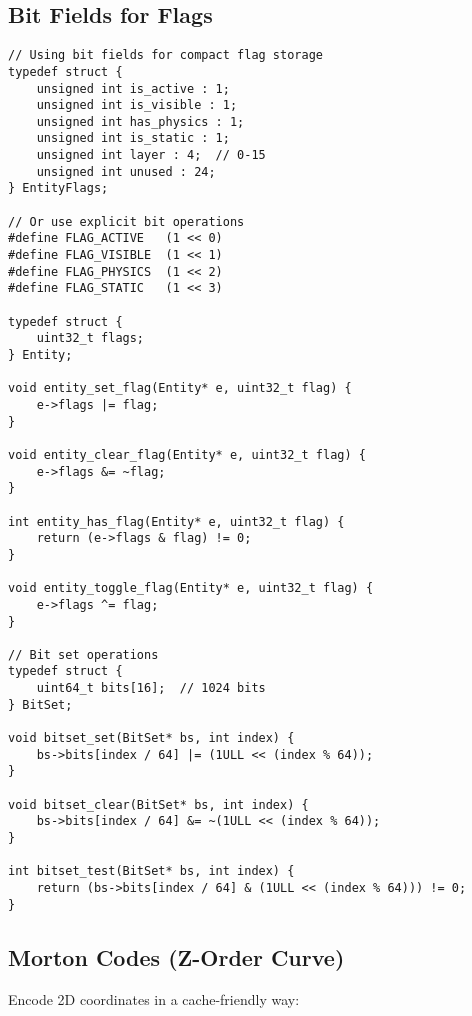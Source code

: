 \subsection{Bit Fields for Flags}

\begin{lstlisting}
// Using bit fields for compact flag storage
typedef struct {
    unsigned int is_active : 1;
    unsigned int is_visible : 1;
    unsigned int has_physics : 1;
    unsigned int is_static : 1;
    unsigned int layer : 4;  // 0-15
    unsigned int unused : 24;
} EntityFlags;

// Or use explicit bit operations
#define FLAG_ACTIVE   (1 << 0)
#define FLAG_VISIBLE  (1 << 1)
#define FLAG_PHYSICS  (1 << 2)
#define FLAG_STATIC   (1 << 3)

typedef struct {
    uint32_t flags;
} Entity;

void entity_set_flag(Entity* e, uint32_t flag) {
    e->flags |= flag;
}

void entity_clear_flag(Entity* e, uint32_t flag) {
    e->flags &= ~flag;
}

int entity_has_flag(Entity* e, uint32_t flag) {
    return (e->flags & flag) != 0;
}

void entity_toggle_flag(Entity* e, uint32_t flag) {
    e->flags ^= flag;
}

// Bit set operations
typedef struct {
    uint64_t bits[16];  // 1024 bits
} BitSet;

void bitset_set(BitSet* bs, int index) {
    bs->bits[index / 64] |= (1ULL << (index % 64));
}

void bitset_clear(BitSet* bs, int index) {
    bs->bits[index / 64] &= ~(1ULL << (index % 64));
}

int bitset_test(BitSet* bs, int index) {
    return (bs->bits[index / 64] & (1ULL << (index % 64))) != 0;
}
\end{lstlisting}

\subsection{Morton Codes (Z-Order Curve)}

Encode 2D coordinates in a cache-friendly way:

